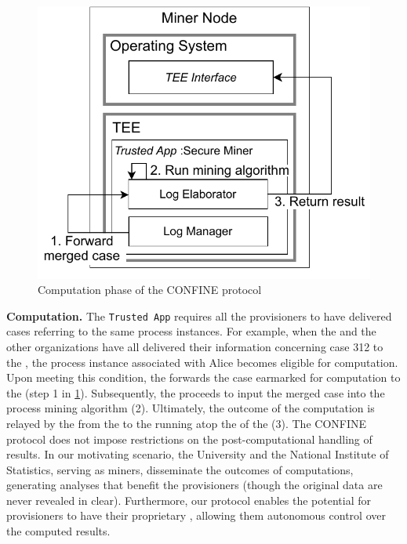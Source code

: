 \begin{figure}
	\vspace{-1em}
	\includegraphics[width=\textwidth]{content/figures/computationworkflow.pdf}
	\caption[A gull]{Computation phase of the CONFINE protocol}
	\vspace{-2pt}
	\label{fig:computation}
\end{figure}
%
\noindent\textbf{Computation.} The \texttt{Trusted App} requires all the provisioners to have delivered cases referring to the same process instances. For example, when the  and the other organizations have all delivered their information concerning case 312 to the , the process instance associated with Alice becomes eligible for computation. Upon meeting this condition, the  forwards the case earmarked for computation to the  (step 1 in \cref{fig:computation}). Subsequently, the  proceeds to input the merged case into the process mining algorithm (2). Ultimately, the outcome of the computation is relayed by the  from the  to the  running atop the  of the  (3). The CONFINE protocol does not impose restrictions on the post-computational handling of results. In our motivating scenario, the University and the National Institute of Statistics, serving as miners, disseminate the outcomes of computations, generating analyses that benefit the provisioners (though the original data are never revealed in clear). Furthermore, our protocol enables the potential for provisioners to have their proprietary , allowing them autonomous control over the computed results.

